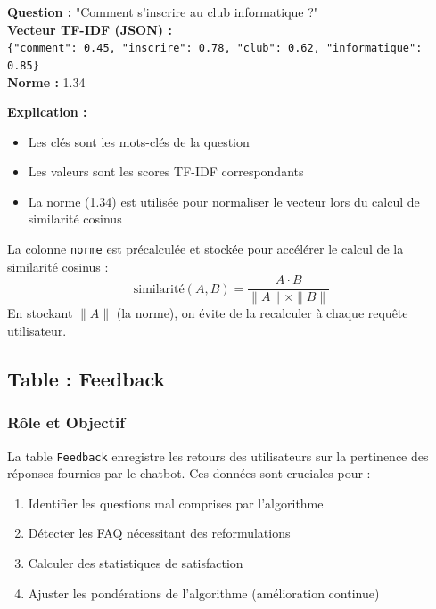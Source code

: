 \documentclass[11pt,a4paper]{article}
\begin{document}
\begin{exemple}
\textbf{Question :} "Comment s'inscrire au club informatique ?" \\
\textbf{Vecteur TF-IDF (JSON) :} \\
\texttt{\{"comment": 0.45, "inscrire": 0.78, "club": 0.62, "informatique": 0.85\}} \\
\textbf{Norme :} 1.34

\vspace{0.3cm}
\textbf{Explication :}
\begin{itemize}
    \item Les clés sont les mots-clés de la question
    \item Les valeurs sont les scores TF-IDF correspondants
    \item La norme (1.34) est utilisée pour normaliser le vecteur lors du calcul de similarité cosinus
\end{itemize}
\end{exemple}

\begin{info}[Performance]
La colonne \texttt{norme} est précalculée et stockée pour accélérer le calcul de la similarité cosinus :
\[
\text{similarité}(A, B) = \frac{A \cdot B}{\|A\| \times \|B\|}
\]
En stockant $\|A\|$ (la norme), on évite de la recalculer à chaque requête utilisateur.
\end{info}

\clearpage

\subsection{Table : Feedback}

\subsubsection{Rôle et Objectif}

La table \texttt{Feedback} enregistre les retours des utilisateurs sur la pertinence des réponses fournies par le chatbot. Ces données sont cruciales pour :

\begin{enumerate}
    \item Identifier les questions mal comprises par l'algorithme
    \item Détecter les FAQ nécessitant des reformulations
    \item Calculer des statistiques de satisfaction
    \item Ajuster les pondérations de l'algorithme (amélioration continue)
\end{enumerate}
\end{document}
